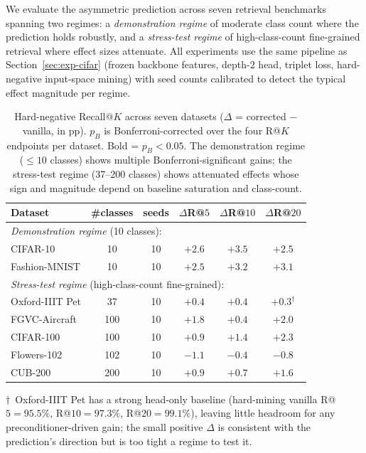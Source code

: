 \documentclass{article}
\begin{document}
We evaluate the asymmetric prediction across seven retrieval benchmarks
spanning two regimes: a \emph{demonstration regime} of moderate class
count where the prediction holds robustly, and a \emph{stress-test
regime} of high-class-count fine-grained retrieval where effect sizes
attenuate. All experiments use the same pipeline as
Section~\ref{sec:exp-cifar} (frozen backbone features, depth-$2$ head,
triplet loss, hard-negative input-space mining) with seed counts
calibrated to detect the typical effect magnitude per regime.

\begin{table}[!htbp]
\centering
\small
\caption{Hard-negative Recall@$K$ across seven datasets ($\Delta$ =
corrected $-$ vanilla, in pp). $p_B$ is Bonferroni-corrected over the
four R@$K$ endpoints per dataset. Bold = $p_B < 0.05$. The
demonstration regime ($\leq 10$ classes) shows multiple
Bonferroni-significant gains; the stress-test regime (37--200 classes)
shows attenuated effects whose sign and magnitude depend on baseline
saturation and class-count.}
\label{tab:cross-dataset}
\begin{tabular}{lccccc}
\toprule
Dataset & \#classes & seeds & $\Delta$R@$5$ & $\Delta$R@$10$ & $\Delta$R@$20$ \\
\midrule
\multicolumn{6}{l}{\emph{Demonstration regime} (10 classes):} \\
CIFAR-10        &  10 & 10 & $\mathbf{+2.6}$ & $\mathbf{+3.5}$ & $\mathbf{+2.5}$ \\
Fashion-MNIST   &  10 & 10 & $\mathbf{+2.5}$ & $\mathbf{+3.2}$ & $\mathbf{+3.1}$ \\
\midrule
\multicolumn{6}{l}{\emph{Stress-test regime} (high-class-count fine-grained):} \\
Oxford-IIIT Pet &  37 & 10 & $+0.4$ & $+0.4$ & $+0.3^{\dagger}$ \\
FGVC-Aircraft   & 100 & 10 & $\mathbf{+1.8}$ & $+0.4$ & $+2.0$ \\
CIFAR-100       & 100 & 10 & $+0.9$ & $+1.4$ & $+2.3$ \\
Flowers-102     & 102 & 10 & $-1.1$ & $-0.4$ & $-0.8$ \\
CUB-200         & 200 & 10 & $+0.9$ & $+0.7$ & $\mathbf{+1.6}$ \\
\bottomrule
\end{tabular}
\end{table}

$\dagger$~Oxford-IIIT Pet has a strong head-only baseline
(hard-mining vanilla R@$5\!=\!95.5\%$, R@$10\!=\!97.3\%$,
R@$20\!=\!99.1\%$), leaving little headroom for any
preconditioner-driven gain; the small positive $\Delta$ is consistent
with the prediction's direction but is too tight a regime to test it.
\end{document}
